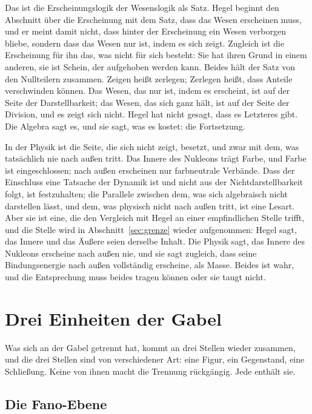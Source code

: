 \documentclass[11pt,a4paper]{article}
\newcommand{\Randlesart}{\marginpar{\raggedright\footnotesize\textcolor{lesart}{$\bigcirc$\,Lesart}}}
\begin{document}
\Randlesart Das ist die Erscheinungslogik der Wesenslogik als Satz. Hegel beginnt den Abschnitt über die Erscheinung mit dem Satz, dass das Wesen erscheinen muss, und er meint damit nicht, dass hinter der Erscheinung ein Wesen verborgen bliebe, sondern dass das Wesen nur ist, indem es sich zeigt. Zugleich ist die Erscheinung für ihn das, was nicht für sich besteht: Sie hat ihren Grund in einem anderen, sie ist Schein, der aufgehoben werden kann. Beides hält der Satz von den Nullteilern zusammen. Zeigen heißt zerlegen; Zerlegen heißt, dass Anteile verschwinden können. Das Wesen, das nur ist, indem es erscheint, ist auf der Seite der Darstellbarkeit; das Wesen, das sich ganz hält, ist auf der Seite der Division, und es zeigt sich nicht. Hegel hat nicht gesagt, dass es Letzteres gibt. Die Algebra sagt es, und sie sagt, was es kostet: die Fortsetzung.

In der Physik ist die Seite, die sich nicht zeigt, besetzt, und zwar mit dem, was tatsächlich nie nach außen tritt. Das Innere des Nukleons trägt Farbe, und Farbe ist eingeschlossen; nach außen erscheinen nur farbneutrale Verbände. Dass der Einschluss eine Tatsache der Dynamik ist und nicht aus der Nichtdarstellbarkeit folgt, ist festzuhalten; die Parallele zwischen dem, was sich algebraisch nicht darstellen lässt, und dem, was physisch nicht nach außen tritt, ist eine Lesart. Aber sie ist eine, die den Vergleich mit Hegel an einer empfindlichen Stelle trifft, und die Stelle wird in Abschnitt~\ref{sec:grenze} wieder aufgenommen: Hegel sagt, das Innere und das Äußere seien derselbe Inhalt. Die Physik sagt, das Innere des Nukleons erscheine nach außen nie, und sie sagt zugleich, dass seine Bindungsenergie nach außen vollständig erscheine, als Masse. Beides ist wahr, und die Entsprechung muss beides tragen können oder sie taugt nicht.

\section{Drei Einheiten der Gabel}
\label{sec:einheiten}

Was sich an der Gabel getrennt hat, kommt an drei Stellen wieder zusammen, und die drei Stellen sind von verschiedener Art: eine Figur, ein Gegenstand, eine Schließung. Keine von ihnen macht die Trennung rückgängig. Jede enthält sie.

\subsection{Die Fano-Ebene}
\end{document}
